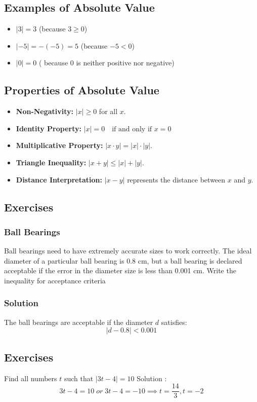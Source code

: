 \subsection{Examples of Absolute Value}
\begin{itemize}
    \item \(|3| = 3\) \quad (because \(3 \geq 0\))
    \item \(|-5| = -(-5) = 5\) \quad (because \(-5 < 0\))
    \item \(|0| = 0\) \quad ( because \(0\) is neither positive nor negative)
\end{itemize}

\subsection{Properties of Absolute Value}
\begin{itemize}
    \item \textbf{Non-Negativity:} \(|x| \geq 0\) for all \(x\).
    \item \textbf{Identity Property:} \(|x| = 0 \quad \text{if and only if } x = 0\)
    \item \textbf{Multiplicative Property:} \(|x \cdot y| = |x| \cdot |y|\).
    \item \textbf{Triangle Inequality:} \( |x + y| \leq |x| + |y| \).
    \item \textbf{Distance Interpretation:} \(|x - y|\) represents the distance between \(x\) and \(y\).
\end{itemize}

\subsection{Exercises}
\subsubsection{Ball Bearings}
Ball bearings need to have extremely accurate sizes to work correctly. The ideal diameter of a particular ball bearing is 0.8 cm, but a ball bearing is declared acceptable if the error in the diameter size is less than 0.001 cm. Write the inequality for acceptance criteria
\subsubsection{Solution}
The ball bearings are acceptable if the diameter \(d\) satisfies:
\[
|d - 0.8| < 0.001
\]

\subsection{Exercises}
Find all numbers \(t \) such that \( |3t-4| = 10\)
Solution :
\[ 3t -4  = 10  \; or \; 3t-4 = -10  \implies t = \frac{14}{3}, t = -2 \]

